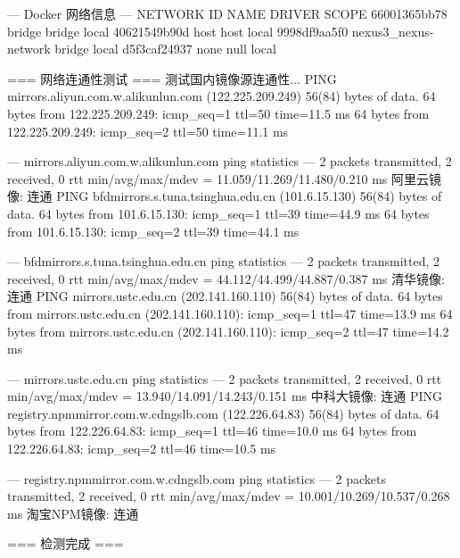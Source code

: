--- Docker 网络信息 ---
NETWORK ID     NAME                   DRIVER    SCOPE
66001365bb78   bridge                 bridge    local
40621549b90d   host                   host      local
9998df9aa5f0   nexus3_nexus-network   bridge    local
d5f3caf24937   none                   null      local

=== 网络连通性测试 ===
测试国内镜像源连通性...
PING mirrors.aliyun.com.w.alikunlun.com (122.225.209.249) 56(84) bytes of data.
64 bytes from 122.225.209.249: icmp_seq=1 ttl=50 time=11.5 ms
64 bytes from 122.225.209.249: icmp_seq=2 ttl=50 time=11.1 ms

--- mirrors.aliyun.com.w.alikunlun.com ping statistics ---
2 packets transmitted, 2 received, 0%
rtt min/avg/max/mdev = 11.059/11.269/11.480/0.210 ms
阿里云镜像: 连通
PING bfdmirrors.s.tuna.tsinghua.edu.cn (101.6.15.130) 56(84) bytes of data.
64 bytes from 101.6.15.130: icmp_seq=1 ttl=39 time=44.9 ms
64 bytes from 101.6.15.130: icmp_seq=2 ttl=39 time=44.1 ms

--- bfdmirrors.s.tuna.tsinghua.edu.cn ping statistics ---
2 packets transmitted, 2 received, 0%
rtt min/avg/max/mdev = 44.112/44.499/44.887/0.387 ms
清华镜像: 连通
PING mirrors.ustc.edu.cn (202.141.160.110) 56(84) bytes of data.
64 bytes from mirrors.ustc.edu.cn (202.141.160.110): icmp_seq=1 ttl=47 time=13.9 ms
64 bytes from mirrors.ustc.edu.cn (202.141.160.110): icmp_seq=2 ttl=47 time=14.2 ms

--- mirrors.ustc.edu.cn ping statistics ---
2 packets transmitted, 2 received, 0%
rtt min/avg/max/mdev = 13.940/14.091/14.243/0.151 ms
中科大镜像: 连通
PING registry.npmmirror.com.w.cdngslb.com (122.226.64.83) 56(84) bytes of data.
64 bytes from 122.226.64.83: icmp_seq=1 ttl=46 time=10.0 ms
64 bytes from 122.226.64.83: icmp_seq=2 ttl=46 time=10.5 ms

--- registry.npmmirror.com.w.cdngslb.com ping statistics ---
2 packets transmitted, 2 received, 0%
rtt min/avg/max/mdev = 10.001/10.269/10.537/0.268 ms
淘宝NPM镜像: 连通

=== 检测完成 ===
